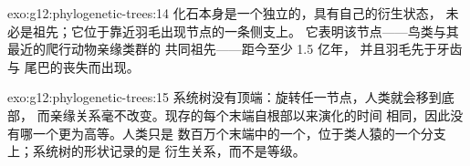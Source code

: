 \begin{solution}{exo:g12:phylogenetic-trees:14}
化石本身是一个独立的，具有自己的衍生状态，
未必是祖先；它位于靠近羽毛出现节点的一条侧支上。
它表明该节点——鸟类与其最近的爬行动物亲缘类群的
共同祖先——距今至少 1.5 亿年，
并且羽毛先于牙齿与
尾巴的丧失而出现。
\end{solution}

\begin{solution}{exo:g12:phylogenetic-trees:15}
系统树没有顶端：旋转任一节点，人类就会移到底部，
而亲缘关系毫不改变。现存的每个末端自根部以来演化的时间
相同，因此没有哪一个更为高等。人类只是
数百万个末端中的一个，位于类人猿的一个分支上；系统树的形状记录的是
衍生关系，而不是等级。
\end{solution}

